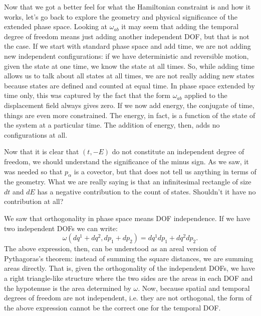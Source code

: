 Now that we got a better feel for what the Hamiltonian constraint is and how it works, let's go back to explore the geometry and physical significance of the extended phase space. Looking at $\omega_{ab}$ it may seem that adding the temporal degree of freedom means just adding another independent DOF, but that is not the case. If we start with standard phase space and add time, we are not adding new independent configurations: if we have deterministic and reversible motion, given the state at one time, we know the state at all times. So, while adding time allows us to talk about all states at all times, we are not really adding new states because states are defined and counted at equal time. In phase space extended by time only, this was captured by the fact that the form $\omega_{ab}$ applied to the displacement field always gives zero. If we now add energy, the conjugate of time, things are even more constrained. The energy, in fact, is a function of the state of the system at a particular time. The addition of energy, then, adds no configurations at all.

Now that it is clear that $(t, -E)$ do not constitute an independent degree of freedom, we should understand the significance of the minus sign. As we saw, it was needed so that $p_\alpha$ is a covector, but that does not tell us anything in terms of the geometry. What we are really saying is that an infinitesimal rectangle of size $dt$ and $dE$ has a negative contribution to the count of states. Shouldn't it have no contribution at all?

We saw that orthogonality in phase space means DOF independence. If we have two independent DOFs we can write:
\begin{equation}\label{rp-cm-rel-spatialPythagoras}
	\omega(dq^1 + dq^2, dp_1 + dp_2) = dq^1 dp_1 + dq^2 dp_2.
\end{equation}
The above expression, then, can be understood as an areal version of Pythagoras's theorem: instead of summing the square distances, we are summing areas directly. That is, given the orthogonality of the independent DOFs, we have a right triangle-like structure where the two sides are the areas in each DOF and the hypotenuse is the area determined by $\omega$.  Now, because spatial and temporal degrees of freedom are not independent, i.e. they are not orthogonal, the form of the above expression cannot be the correct one for the temporal DOF.

